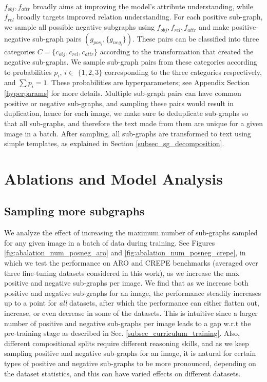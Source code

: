 \documentclass[11pt]{article}
\begin{document}
$f_{obj}, f_{attr}$ broadly aims at improving the model's attribute understanding, while $f_{rel}$ broadly targets improved relation understanding.
For each positive sub-graph, we sample all possible negative subgraphs using $f_{obj}, f_{rel}, f_{attr}$ and make positive-negative sub-graph pairs $(g_{pos_i}, \{g_{neg_i}\})$. These pairs can be classified into three categories $C = \{c_{obj}, c_{rel}, c_{attr}\}$ according to the transformation that created the negative sub-graphs. We sample sub-graph pairs from these categories according to probabilities $p_i$, $i\in$ $\{1,2,3\}$ corresponding to the three categories respectively, and $\sum p_i = 1$. These probabilities are hyperparameters; see Appendix Section \ref{hyperparams} for more details. Multiple sub-graph pairs can have common positive or negative sub-graphs, and sampling these pairs would result in duplication, hence for each image, we make sure to deduplicate sub-graphs so that all sub-graphs, and therefore the text made from them are unique for a given image in a batch. After sampling, all sub-graphs are transformed to text using simple templates, as explained in Section \ref{subsec_sg_decomposition}.

\section{Ablations and Model Analysis}
\label{sec_ablations}

\subsection{Sampling more subgraphs}
\label{more_subgraphs_ablation}
We analyze the effect of increasing the maximum number of sub-graphs sampled for any given image in a batch of data during training. See Figures \ref{fig:abalation_num_posneg_aro} and \ref{fig:abalation_num_posneg_crepe}, in which we test the performance on ARO and CREPE benchmarks (averaged over three fine-tuning datasets considered in this work), as we increase the max positive and negative sub-graphs per image. We find that as we increase both positive and negative sub-graphs for an image, the performance steadily increases up to a point for \textit{all} datasets, after which the performance can either flatten out, increase, or even decrease in some of the datasets. This is intuitive since a larger number of positive and negative sub-graphs per image leads to a gap w.r.t the pre-training stage as described in Sec. \ref{subsec_curriculum_training}. Also, different compositional splits require different reasoning skills, and as we keep sampling positive and negative sub-graphs for an image, it is natural for certain types of positive and negative sub-graphs to be more pronounced, depending on the dataset statistics, and this can have varied effects on different datasets.
\end{document}
